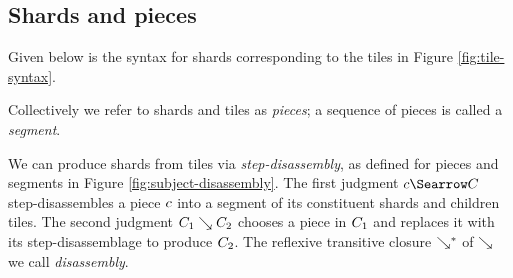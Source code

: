 


\subsection{Shards and pieces} \label{sec:shards-and-pieces}

Given below is the syntax for shards corresponding to the tiles
in Figure \ref{fig:tile-syntax}.


\noindent {}
Collectively we refer to shards and tiles as \emph{pieces};
a sequence of pieces is called a \emph{segment}.





We can produce shards from tiles via \emph{step-disassembly},
as defined for pieces and segments in Figure \ref{fig:subject-disassembly}.
The first judgment $\pieceDisassembles{\selem}{\selection}$
step-disassembles a piece $c$ into a segment of
its constituent shards and children tiles.
The second judgment $C_1 \searrow C_2$
chooses a piece in $C_1$ and replaces it with its
step-disassemblage to produce $C_2$.
The reflexive transitive closure $\searrow^*$ of
$\searrow$ we call \emph{disassembly}.

